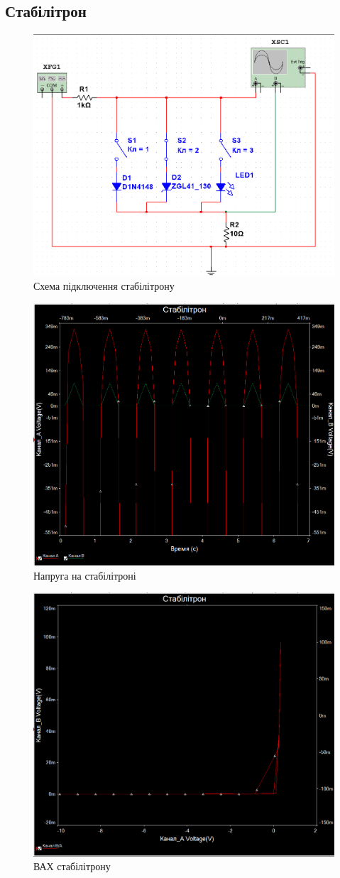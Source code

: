 \documentclass[
  ukrainian,
  14pt
]{extreport}
\begin{document}
\subsection{Стабілітрон}
\begin{figure}[H]
    \centering
    \includegraphics[width=.6\textwidth]{imgs/S-1.png}
    \caption{Схема підключення стабілітрону}
\end{figure}
\begin{figure}[H]
    \centering
    \includegraphics[width=.6\textwidth]{imgs/S-2.png}
    \caption{Напруга на стабілітроні}
\end{figure}
\begin{figure}[H]
    \centering
    \includegraphics[width=.6\textwidth]{imgs/S-3.png}
    \caption{ВАХ стабілітрону}
\end{figure}
\end{document}
